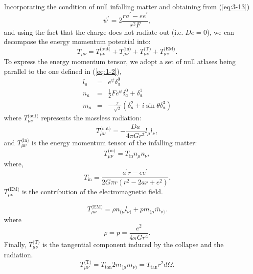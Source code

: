 \documentclass[letterpaper,12pt]{article}
\begin{document}
Incorporating the condition of null infalling matter and obtaining from (\ref{eq:3-13})
\begin{equation}
\psi^{\prime} = 2\frac{ra^{\prime}-ee^{\prime}}{r^{2}F},
\end{equation}
and using the fact that the charge does not radiate out (i.e. $De = 0$), we can decompose the energy momentum potential into:
\begin{equation}
T_{\mu\nu}= T^{\textrm{(out)}}_{\mu\nu}+T^{\textrm{(in)}}_{\mu\nu}+T^{\textrm{(T)}}_{\mu\nu}+T^{\textrm{(EM)}}_{\mu\nu}.
\end{equation}
To express the energy momentum tensor, we adopt a set of null atlases being parallel to the one defined in (\ref{eq:1-2}),
\begin{eqnarray}
  l_{a} &=& e^{\psi}\delta_{a}^{0} \\
  n_{a} &=&  \frac{1}{2}Fe^{\psi} \delta_{a}^{0}+ \delta_{a}^{1} \\
  m_{a} &=& -\frac{r}{\sqrt{2}}\left( \delta_{a}^{2}+ i\sin\theta \delta_{a}^{3}\right)
\end{eqnarray}
where $T^{\textrm{(out)}}_{\mu\nu}$ represents the massless radiation:
\begin{equation}
T^{\textrm{(out)}}_{\mu\nu} = -\frac{Da}{4\pi G r^2}l_{\mu}l_{\nu},
\end{equation}
and $T^{\textrm{(in)}}_{\mu\nu}$ is the energy momentum tensor of the infalling matter:
\begin{equation}
T^{\textrm{(in)}}_{\mu\nu} = T_{\textrm{in}}n_{\mu}n_{\nu},
\end{equation}
where,
\begin{equation}
T_{\textrm{in}}=
\frac{a^{\prime}r-ee^{\prime}}{2G\pi r(r^{2}-2ar+e^{2})}.
\end{equation}
$T^{\textrm{(EM)}}_{\mu\nu}$ is the contribution of the electromagnetic field.

\begin{equation}
T^{\textrm{(EM)}}_{\mu\nu} = \rho n_{(\mu}l_{\nu)}+pm_{(\mu} \bar{m}_{\nu)}.
\end{equation}
where
\begin{equation}
\rho = p = \frac{e^2}{4\pi G r^4}.
\end{equation}
Finally, $T^{\textrm{(T)}}_{\mu\nu}$ is the tangential component induced by the collapse and the radiation.
\begin{equation}
T^{\textrm{(T)}}_{\mu\nu}=T_{\textrm{tan}}2m_{(\mu} \bar{m}_{\nu)}= T_{\textrm{tan}}r^2d\Omega.
\end{equation}
\end{document}
